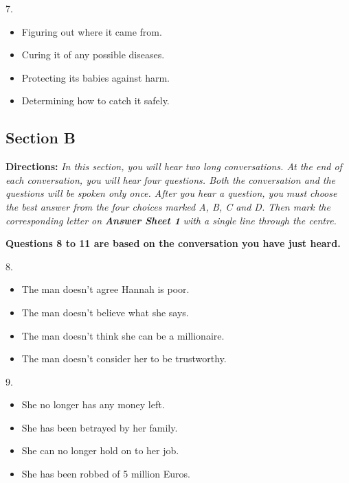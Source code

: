 \documentclass[UTF8,11pt]{ctexart}
\begin{document}
7.


\begin{itemize}[leftmargin=2em,itemsep=.2em,topsep=.4em]\item[A.] Figuring out where it came from.
\item[B.] Curing it of any possible diseases.
\item[C.] Protecting its babies against harm.
\item[D.] Determining how to catch it safely.
\end{itemize}

\subsection*{\textbf{Section B}}


\textbf{Directions:} \textit{In this section, you will hear two long conversations. At the end of each conversation, you will hear} \textit{four questions. Both the conversation and the questions will be spoken only once. After you hear a question, you} \textit{must choose the best answer from the four choices marked A, B, C and D. Then mark the corresponding letter on} \textbf{\textit{Answer Sheet 1}}\textit{ with a single line through the centre.}


\textbf{Questions 8 to 11 are based on the conversation you have just heard.}


8.


\begin{itemize}[leftmargin=2em,itemsep=.2em,topsep=.4em]\item[A.] The man doesn’t agree Hannah is poor.
\item[B.] The man doesn’t believe what she says.
\item[C.] The man doesn’t think she can be a millionaire.
\item[D.] The man doesn’t consider her to be trustworthy.
\end{itemize}

9.


\begin{itemize}[leftmargin=2em,itemsep=.2em,topsep=.4em]\item[A.] She no longer has any money left.
\item[B.] She has been betrayed by her family.
\item[C.] She can no longer hold on to her job.
\item[D.] She has been robbed of 5 million Euros.
\end{itemize}
\end{document}
